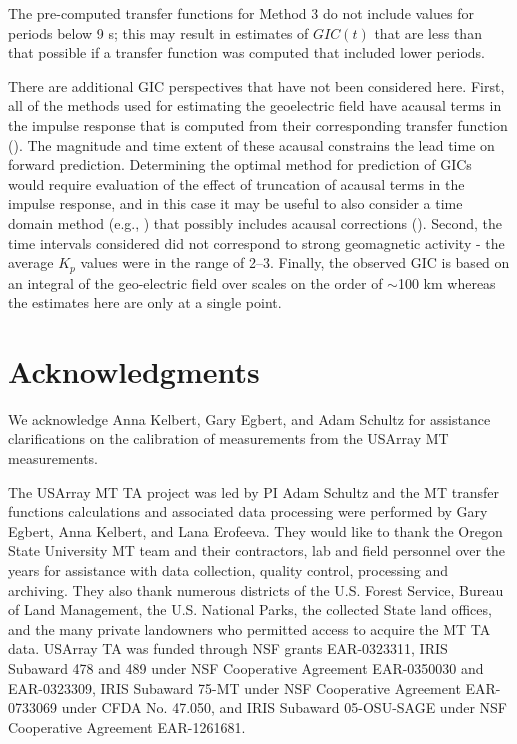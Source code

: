 \documentclass[12pt]{article}
\begin{document}
The pre-computed transfer functions for Method 3 do not include values for periods below 9 s; this may result in estimates of $GIC(t)$ that are less than that possible if a transfer function was computed that included lower periods. 

There are additional GIC perspectives that have not been considered here.  First, all of the methods used for estimating the geoelectric field have acausal terms in the impulse response that is computed from their corresponding transfer function (\cite{Egbert1992}).  The magnitude and time extent of these acausal constrains the lead time on forward prediction.  Determining the optimal method for prediction of GICs would require evaluation of the effect of truncation of acausal terms in the impulse response, and in this case it may be useful to also consider a time domain method (e.g., \cite{McMechan1985}) that possibly includes acausal corrections (\cite{Tzschoppe2009}).  Second, the time intervals considered did not correspond to strong geomagnetic activity - the average $K_p$ values were in the range of 2--3.  Finally, the observed GIC is based on an integral of the geo-electric field over scales on the order of $\sim$100 km whereas the estimates here are only at a single point.

\section{Acknowledgments}

We acknowledge Anna Kelbert, Gary Egbert, and Adam Schultz for assistance clarifications on the calibration of measurements from the USArray MT measurements.

The USArray MT TA project was led by PI Adam Schultz and the MT transfer functions calculations and associated data processing were performed by Gary Egbert, Anna Kelbert, and Lana Erofeeva.  They would like to thank the Oregon State University MT team and their contractors, lab and field personnel over the years for assistance with data collection, quality control, processing and archiving. They also thank numerous districts of the U.S. Forest Service, Bureau of Land Management, the U.S. National Parks, the collected State land offices, and the many private landowners who permitted access to acquire the MT TA data. USArray TA was funded through NSF grants EAR-0323311, IRIS Subaward 478 and 489 under NSF Cooperative Agreement EAR-0350030 and EAR-0323309, IRIS Subaward 75-MT under NSF Cooperative Agreement EAR-0733069 under CFDA No. 47.050, and IRIS Subaward 05-OSU-SAGE under NSF Cooperative Agreement EAR-1261681.
\end{document}
